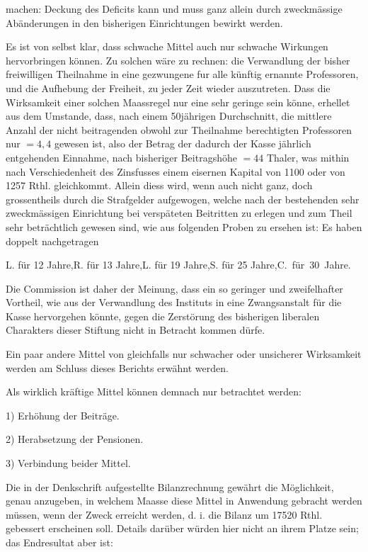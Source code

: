 machen: Deckung des Deficits kann und muss ganz allein durch zweckmässige Abänderungen in den bisherigen Einrichtungen bewirkt werden.

Es ist von selbst klar, dass schwache Mittel auch nur schwache Wirkungen hervorbringen können. Zu solchen wäre zu rechnen: die Verwandlung der bisher freiwilligen Theilnahme in eine gezwungene fur alle künftig ernannte Professoren, und die Aufhebung der Freiheit, zu jeder Zeit wieder auszutreten. Dass die Wirksamkeit einer solchen Maassregel nur eine sehr geringe sein könne, erhellet aus dem Umstande, dass, nach einem 50jährigen Durchschnitt, die mittlere Anzahl der nicht beitragenden obwohl zur Theilnahme berechtigten Professoren nur \(=4{,}4\) gewesen ist, also der Betrag der dadurch der Kasse jährlich entgehenden Einnahme, nach bisheriger Beitragshöhe \(=44\) Thaler, was mithin nach Verschiedenheit des Zinsfusses einem eisernen Kapital von 1100 oder von 1257 Rthl. gleichkommt. Allein diess wird, wenn auch nicht ganz, doch grossentheils durch die Strafgelder aufgewogen, welche nach der bestehenden sehr zweckmässigen Einrichtung bei verspäteten Beitritten zu erlegen und zum Theil sehr beträchtlich gewesen sind, wie aus folgenden Proben zu ersehen ist: Es haben doppelt nachgetragen
\begin{center}
L. für 12 Jahre,\quad R. für 13 Jahre,\quad L. für 19 Jahre,\quad S. für 25 Jahre,\quad \mbox{C. für 30 Jahre.}
\end{center}
\noindent\hspace*{\parindent}Die Commission ist daher der Meinung, dass ein so geringer und zweifelhafter Vortheil, wie aus der Verwandlung des Instituts in eine Zwangsanstalt für die Kasse hervorgehen könnte, gegen die Zerstörung des bisherigen liberalen Charakters dieser Stiftung nicht in Betracht kommen dürfe.

Ein paar andere Mittel von gleichfalls nur schwacher oder unsicherer Wirksamkeit werden am Schluss dieses Berichts erwähnt werden.

Als wirklich kräftige Mittel können demnach nur betrachtet werden:

1) Erhöhung der Beiträge.

2) Herabsetzung der Pensionen.

3) Verbindung beider Mittel.

Die in der Denkschrift aufgestellte Bilanzrechnung gewährt die Möglichkeit, genau anzugeben, in welchem Maasse diese Mittel in Anwendung gebracht werden müssen, wenn der Zweck erreicht werden, d. i. die Bilanz um 17520 Rthl. gebessert erscheinen soll. Details darüber würden hier nicht an ihrem Platze sein; das Endresultat aber ist:

